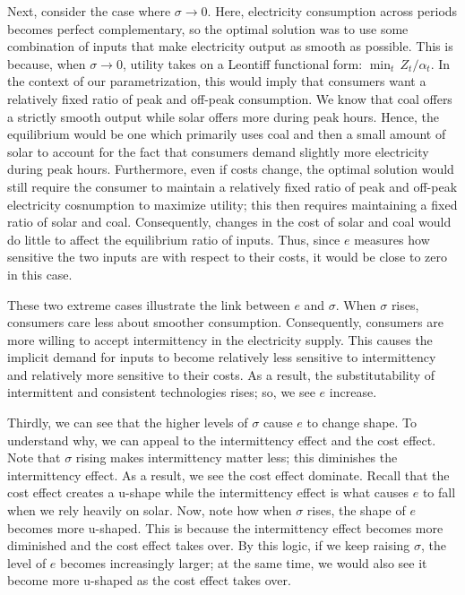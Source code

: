 \documentclass[11pt,a4paper,leqno]{extarticle}
\begin{document}
	Next, consider the case where $\sigma \to 0$. Here, electricity consumption across periods becomes perfect complementary, so  the optimal solution was to use some combination of inputs that make electricity output as smooth as possible. This is because, when $\sigma \to 0$, utility takes on a Leontiff functional form: $\min_t \, Z_t/\alpha_t$. In the context of our parametrization, this would  imply that consumers want a relatively fixed ratio of peak and off-peak consumption. We know that coal offers a strictly smooth output while solar offers more during peak hours. Hence, the equilibrium would be one which primarily uses coal and then a small amount of solar to account for the fact that consumers demand slightly more electricity during peak hours. Furthermore, even if costs change, the optimal solution would still require the consumer to maintain a relatively fixed ratio of peak and off-peak electricity cosnumption to maximize utility; this then requires maintaining a fixed ratio of solar and coal. Consequently, changes in the cost of solar and coal would do little to affect the equilibrium ratio of inputs. Thus, since $e$ measures how sensitive the two inputs are with respect to their costs, it would be close to zero in this case. 
	
	These two extreme cases illustrate the link between $e$ and $\sigma$. When $\sigma$ rises, consumers care less about smoother consumption. Consequently, consumers are more willing to accept intermittency in the electricity supply. This causes the implicit demand for inputs to become relatively less sensitive to intermittency and relatively more sensitive to their costs. As a result, the substitutability of intermittent and consistent technologies rises; so, we see $e$ increase. 
	
	Thirdly, we can see that the higher levels of $\sigma$ cause $e$ to change shape. To understand why, we can appeal to the intermittency effect and the cost effect. Note that $\sigma$ rising makes intermittency matter less; this diminishes the intermittency effect. As a result, we see the cost effect dominate. Recall that the cost effect creates a u-shape while the intermittency effect is what causes $e$ to fall when we rely heavily on solar. Now, note how when $\sigma$ rises, the shape of $e$ becomes more u-shaped. This is because the intermittency effect becomes more diminished and the cost effect takes over.  By this logic, if we keep raising $\sigma$, the level of $e$ becomes increasingly larger; at the same time, we would also see it become more u-shaped as the cost effect takes over. 
	
\end{document}

